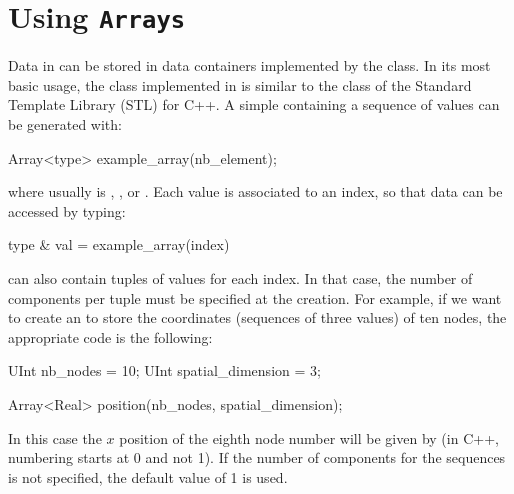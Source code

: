 

\section{Using \texttt{Arrays}}

Data in \akantu can be stored in data containers implemented by
the  class. In its most basic usage, the  class
implemented in \akantu is similar to the  class of
the Standard Template Library (STL) for C++. A simple 
containing a sequence of  values can be generated with:
\begin{cpp}
  Array<type> example_array(nb_element);
\end{cpp}
where  usually is , ,  or
. Each value is associated to an index, so that data can be
accessed by typing:

\begin{cpp}
  type & val = example_array(index)
\end{cpp}

 can also contain tuples of values for each index. In
that case, the number of components per tuple must be specified at the
 creation.  For example, if we want to create an
 to store the coordinates (sequences of three values) of
ten nodes, the appropriate code is the following:
\begin{cpp}
  UInt nb_nodes = 10;
  UInt spatial_dimension = 3;

  Array<Real> position(nb_nodes, spatial_dimension);
\end{cpp}
In this case the $x$ position of the eighth node number will be given by
 (in C++, numbering starts at 0 and not
1). If the number of components for the sequences is not specified, the
default value of 1 is used.

